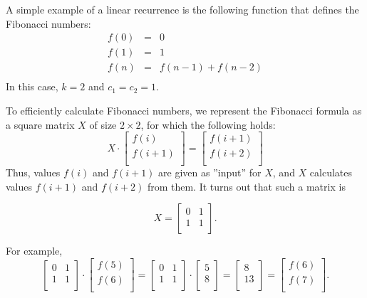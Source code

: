 
A simple example of a linear recurrence is the
following function that defines the Fibonacci numbers:
\[
    \begin{array}{lcl}
        f(0) & = & 0             \\
        f(1) & = & 1             \\
        f(n) & = & f(n-1)+f(n-2) \\
    \end{array}
\]
In this case, $k=2$ and $c_1=c_2=1$.

\begin{samepage}
    To efficiently calculate Fibonacci numbers,
    we represent the
    Fibonacci formula as a
    square matrix $X$ of size $2 \times 2$,
    for which the following holds:
    \[ X \cdot
        \begin{bmatrix}
            f(i)   \\
            f(i+1) \\
        \end{bmatrix}
        =
        \begin{bmatrix}
            f(i+1) \\
            f(i+2) \\
        \end{bmatrix}
    \]
    Thus, values $f(i)$ and $f(i+1)$ are given as
    ''input'' for $X$,
    and $X$ calculates values $f(i+1)$ and $f(i+2)$
    from them.
    It turns out that such a matrix is

    \[ X =
        \begin{bmatrix}
            0 & 1 \\
            1 & 1 \\
        \end{bmatrix}.
    \]
\end{samepage}
\noindent
For example,
\[
    \begin{bmatrix}
        0 & 1 \\
        1 & 1 \\
    \end{bmatrix}
    \cdot
    \begin{bmatrix}
        f(5) \\
        f(6) \\
    \end{bmatrix}
    =
    \begin{bmatrix}
        0 & 1 \\
        1 & 1 \\
    \end{bmatrix}
    \cdot
    \begin{bmatrix}
        5 \\
        8 \\
    \end{bmatrix}
    =
    \begin{bmatrix}
        8  \\
        13 \\
    \end{bmatrix}
    =
    \begin{bmatrix}
        f(6) \\
        f(7) \\
    \end{bmatrix}.
\]
